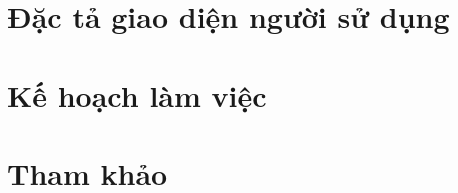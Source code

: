 \documentclass[a4paper, 12pt]{article}
\begin{document}
    \section{Đặc tả giao diện người sử dụng}
    \label{sec:describeUI}
    \clearpage

    \section{Kế hoạch làm việc}
    \label{sec:plan}
    \clearpage

    \section{Tham khảo}
    \label{sec:reference}
    \clearpage
\end{document}
